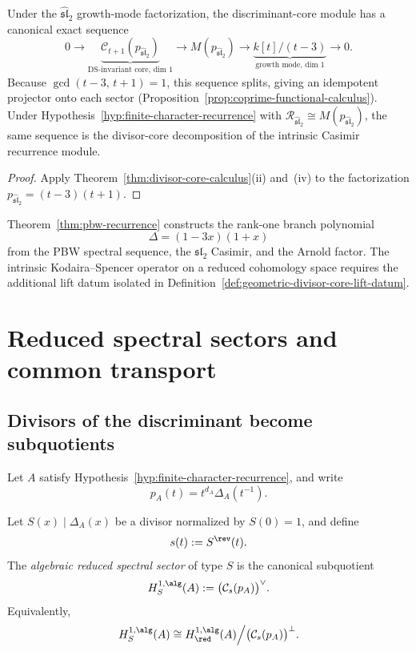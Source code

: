 \begin{corollary}
\label{cor:growth-ds-divisor-cores}
Under the \(\widehat{\mathfrak{sl}}_2\) growth-mode factorization,
the discriminant-core module has a canonical exact sequence
\[
0\longrightarrow
\underbrace{\mathcal C_{t+1}
(p_{\widehat{\mathfrak{sl}}_2})}_{\text{DS-invariant core, dim }1}
\longrightarrow
M(p_{\widehat{\mathfrak{sl}}_2})
\longrightarrow
\underbrace{k[t]/(t{-}3)}_{\text{growth mode, dim }1}
\longrightarrow 0.
\]
Because
\(\gcd(t{-}3,\,
t{+}1)=1\), this sequence splits, giving an idempotent
projector onto each sector
(Proposition~\ref{prop:coprime-functional-calculus}).
Under Hypothesis~\ref{hyp:finite-character-recurrence} with
\(\mathcal R_{\widehat{\mathfrak{sl}}_2}\cong M(p_{\widehat{\mathfrak{sl}}_2})\),
the same sequence is the divisor-core decomposition of the intrinsic
Casimir recurrence module.
\end{corollary}

\begin{proof}
Apply Theorem~\ref{thm:divisor-core-calculus}(ii) and~(iv)
to the factorization
\(p_{\widehat{\mathfrak{sl}}_2}=(t{-}3)(t{+}1)\).
\end{proof}

\begin{remark}
\label{rem:intrinsic-resolution}
Theorem~\ref{thm:pbw-recurrence} constructs the rank-one branch
polynomial
\[
\Delta=(1{-}3x)(1{+}x)
\]
from the PBW spectral sequence, the \(\mathfrak{sl}_2\) Casimir, and
the Arnold factor.
The intrinsic Kodaira--Spencer operator on a reduced cohomology space
requires the additional lift datum isolated in
Definition~\ref{def:geometric-divisor-core-lift-datum}.
\end{remark}

\section{Reduced spectral sectors and common transport}

\subsection{Divisors of the discriminant become subquotients}

Let \(A\) satisfy Hypothesis~\ref{hyp:finite-character-recurrence}, and write
\[
p_A(t)=t^{d_A}\Delta_A(t^{-1}).
\]

\begin{definition}
Let \(S(x)\mid \Delta_A(x)\) be a divisor normalized by \(S(0)=1\), and define
\[
s(t):=S^{\rev}(t).
\]
The \emph{algebraic reduced spectral sector} of type \(S\) is the canonical subquotient
\[
H^{1,\alg}_S(A):=\bigl(\mathcal C_s(p_A)\bigr)^\vee.
\]
Equivalently,
\[
H^{1,\alg}_S(A)\cong H^{1,\alg}_{\red}(A)\Big/\bigl(\mathcal C_s(p_A)\bigr)^\perp.
\]
\end{definition}


